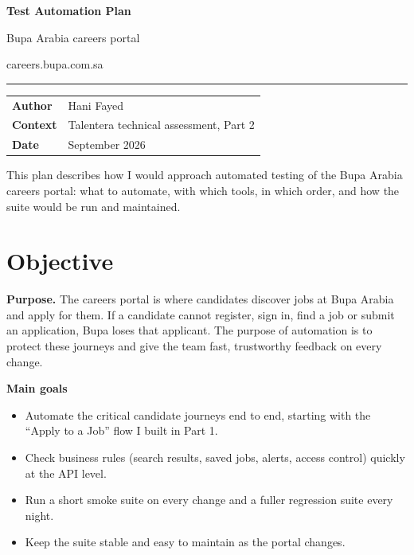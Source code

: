 \documentclass[11pt,a4paper]{article}
\begin{document}
\begin{titlepage}
\vspace*{4cm}
{\color{accent}\Huge\bfseries Test Automation Plan\par}
\vspace{0.6cm}
{\Large\color{muted} Bupa Arabia careers portal\par}
\vspace{0.2cm}
{\large\color{muted} careers.bupa.com.sa\par}
\vspace{0.8cm}
{\color{accent}\rule{\linewidth}{0.8pt}}
\vspace{0.6cm}

\begin{tabular}{@{}ll@{}}
\textbf{Author} & Hani Fayed \\
\textbf{Context} & Talentera technical assessment, Part 2 \\
\textbf{Date} & September 2026 \\
\end{tabular}

\vfill
{\small\color{muted} This plan describes how I would approach automated testing of the Bupa Arabia careers
portal: what to automate, with which tools, in which order, and how the suite would be run and maintained.\par}
\end{titlepage}

\tableofcontents
\thispagestyle{empty}
\newpage
\setcounter{page}{1}

\section{Objective}

\textbf{Purpose.} The careers portal is where candidates discover jobs at Bupa Arabia and apply for them.
If a candidate cannot register, sign in, find a job or submit an application, Bupa loses that applicant.
The purpose of automation is to protect these journeys and give the team fast, trustworthy feedback on
every change.

\textbf{Main goals}
\begin{itemize}
  \item Automate the critical candidate journeys end to end, starting with the ``Apply to a Job'' flow I built in Part 1.
  \item Check business rules (search results, saved jobs, alerts, access control) quickly at the API level.
  \item Run a short smoke suite on every change and a fuller regression suite every night.
  \item Keep the suite stable and easy to maintain as the portal changes.
\end{itemize}
\end{document}
